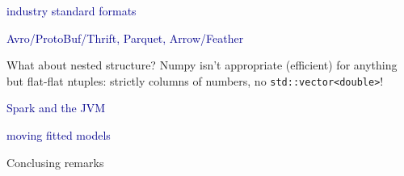 \documentclass{beamer}
\begin{document}


\begin{frame}{}
\begin{center}
\LARGE \textcolor{darkblue}{industry standard formats}

\vspace{0.25 cm}
\textcolor{darkblue}{\Large Avro/ProtoBuf/Thrift, Parquet, Arrow/Feather}
\end{center}
\end{frame}

\begin{frame}{What about nested structure?}
Numpy isn't appropriate (efficient) for anything but flat-flat ntuples: strictly columns of numbers, no {\tt\small std::vector<double>}!






\end{frame}



\begin{frame}{}
\begin{center}
\LARGE \textcolor{darkblue}{Spark and the JVM}
\end{center}
\end{frame}

\begin{frame}{}
\begin{center}
\LARGE \textcolor{darkblue}{moving fitted models}
\end{center}
\end{frame}

\begin{frame}{Conclusing remarks}

\end{frame}
\end{document}
